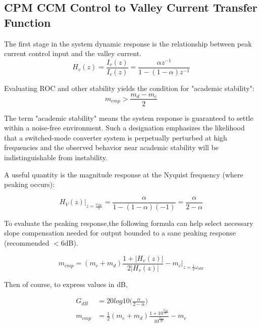 \documentclass{scrartcl}
\begin{document}
		\subsection{CPM CCM Control to Valley Current Transfer Function}
		The first stage in the system dynamic response is the relationship between peak current control input and the valley current. 
		\begin{equation}
		H_v(z) = \frac {I_v(z)} {I_c(z)} = \frac {\alpha z^{-1}} {1 - (1-\alpha) z^{-1}}  \label{hvz}
		\end{equation}
			
		Evaluating ROC and other stability yields the condition for "academic stability":
		\begin{equation}
		m_{cmp} > \dfrac{m_d - m_c}{2} \label{slope_stab}
		\end{equation}
		
		The term "academic stability" means the system response is guaranteed to settle within a noise-free environment.  Such a designation emphasizes the likelihood that a switched-mode converter system is perpetually perturbed at high frequencies and the observed behavior near academic stability will be indistinguishable from instability.
		
		A useful quantity is the magnitude response at the Nyquist frequency (where peaking occurs):		
		
		\begin{equation}
		H_V(z) \bigg|_{z=\frac{\omega_{SW}}{2}} = \dfrac{\alpha }{1 - (1 - \alpha) (-1)} = \dfrac{\alpha}{2 - \alpha} \label{cpmstability}
		\end{equation}
		
		To evaluate the peaking response,the following formula can help select necessary slope compensation needed for output bounded to a sane peaking response (recommended $<6$dB).

		\begin{equation}
		m_{cmp} = (m_c + m_d) \frac{1 + |H_v(z)|}{2|H_v(z)|} - m_c \bigg|_{z=\frac{1}{2}\omega_{SW}}
		\end{equation}
		
		Then of course, to express values in dB,
		
		\begin{align}
		G_{dB} &= 20log10\bigg(\frac{\alpha}{2-\alpha}\bigg)\label{Gpeaking}\\
		m_{cmp} &= \frac{1}{2}(m_c + m_d) \frac{1 + 10^\frac{G_{dB}}{20}}{10^\frac{G_{dB}}{20}}  - m_c \label{mcmp_for_gpeaking}
		\end{align}
		
\end{document}
